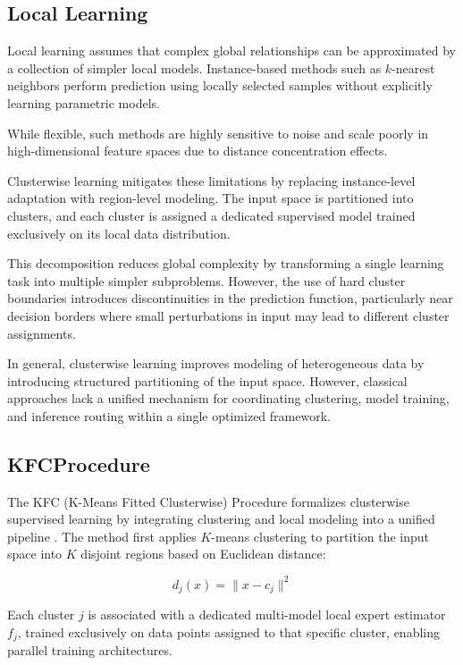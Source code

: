 \subsection{Local Learning}

\hs Local learning assumes that complex global relationships can be approximated by a collection of simpler local models. Instance-based methods such as $k$-nearest neighbors perform prediction using locally selected samples without explicitly learning parametric models.

While flexible, such methods are highly sensitive to noise and scale poorly in high-dimensional feature spaces due to distance concentration effects.

Clusterwise learning mitigates these limitations by replacing instance-level adaptation with region-level modeling. The input space is partitioned into clusters, and each cluster is assigned a dedicated supervised model trained exclusively on its local data distribution.

This decomposition reduces global complexity by transforming a single learning task into multiple simpler subproblems. However, the use of hard cluster boundaries introduces discontinuities in the prediction function, particularly near decision borders where small perturbations in input may lead to different cluster assignments.


In general, clusterwise learning improves modeling of heterogeneous data by introducing structured partitioning of the input space. However, classical approaches lack a unified mechanism for coordinating clustering, model training, and inference routing within a single optimized framework.


\subsection{KFCProcedure}

\hs The KFC (K-Means Fitted Clusterwise) Procedure formalizes clusterwise supervised learning by integrating clustering and local modeling into a unified pipeline \cite{has2021kfc}. The method first applies $K$-means clustering to partition the input space into $K$ disjoint regions based on Euclidean distance:

\[    
    d_j(x) = \|x - c_j\|^2
\]

Each cluster $j$ is associated with a dedicated multi-model local expert estimator $f_j$, trained exclusively on data points assigned to that specific cluster, enabling parallel training architectures.

